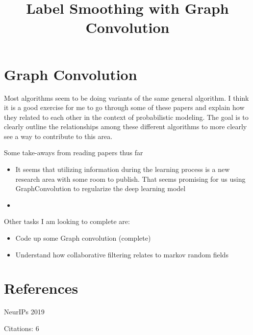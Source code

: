 \documentclass[11pt]{article}
\title{Label Smoothing with Graph Convolution}
\author{}
\date{}
\begin{document}
\maketitle

\section{Graph Convolution}

Most algorithms seem to be doing variants of the same general algorithm. I think it is a good exercise for me to go through some of these papers and explain how they related to each other in the context of probabilistic modeling. The goal is to clearly outline the relationships among these different algorithms to more clearly see a way to contribute to this area.

% 

\vspace{2cm}
\noindent Some take-aways from reading papers thus far
\begin{itemize}
\item It seems that utilizing information during the learning process is a new research area with some room to publish. That seems promising for us using GraphConvolution to regularize the deep learning model
\item 
\end{itemize}

\vspace{2cm}
\noindent Other tasks I am looking to complete are:
\begin{itemize}
\item Code up some Graph convolution (complete)
\item Understand how collaborative filtering relates to markov random fields
\end{itemize}

\newpage

\section{References}

\noindent NeurIPs 2019

\noindent Citations: 6
\end{document}
